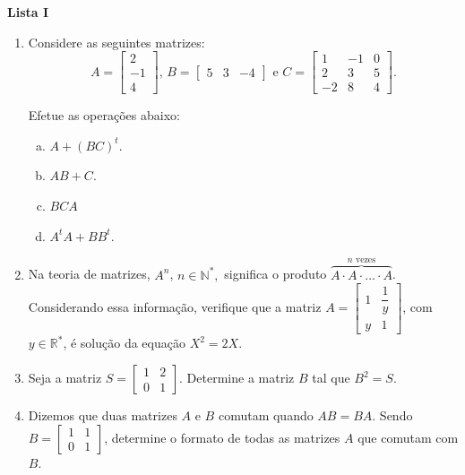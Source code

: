 \documentclass[12pt,a4paper]{article}
\begin{document}
\begin{center}
  \textbf{Lista I}
\end{center}

\begin{enumerate}
  \item Considere as seguintes matrizes:
    $$A = \begin{bmatrix}2 \\ -1 \\ 4\end{bmatrix},\,B = \begin{bmatrix}5 & 3 & -4\end{bmatrix}\textrm{ e }
    C = \begin{bmatrix}1 & -1 & 0 \\ 2 & 3 & 5 \\ -2 & 8 & 4\end{bmatrix}.
    $$

    Efetue as operações abaixo:
    \begin{enumerate}[(a)]
      \item $A + (BC)^t$.
      \item $AB + C$.
      \item $BCA$
      \item $A^tA + BB^t$.
    \end{enumerate}

  \item Na teoria de matrizes, $A^{n}$, $n\in\mathbb{N}^*,$ significa o produto
    $\overbrace{A\cdot A\cdot\ldots\cdot A}^{n\textrm{ vezes}}$. Considerando
    essa informação, verifique que a matriz 
    $A=\left[\begin{array}{rr}
      1 & \dfrac{1}{y}\\
      y & 1
    \end{array}\right]$, com $y\in\mathbb{R}^{*}$, é solução da equação $X^{2}=2X$.

  \item Seja a matriz 
    $S=\left[\begin{array}{rr}
      1 & 2\\
      0 & 1
    \end{array}\right]$. Determine a matriz $B$ tal que $B^{2}=S$.

  \item Dizemos que duas matrizes $A$ e $B$ comutam quando $AB=BA$. Sendo
    $B=\left[\begin{array}{rr}
      1 & 1\\
      0 & 1
    \end{array}\right]$, determine o formato de todas as matrizes $A$ que comutam com $B$.


\end{enumerate}
\end{document}
